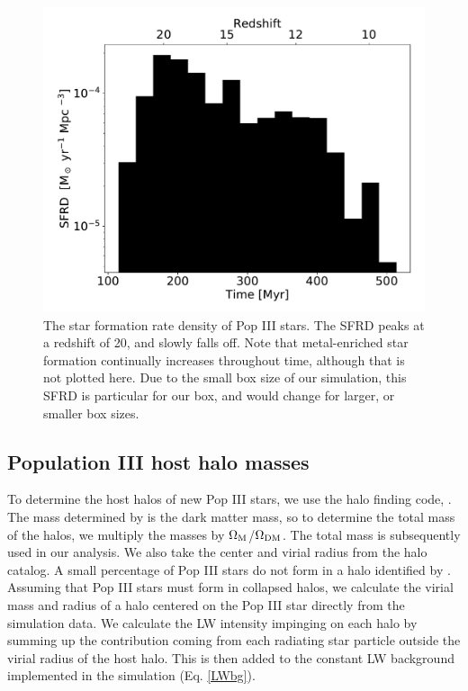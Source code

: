 \documentclass[a4paper,fleqn,usenatbib]{mnras}
\begin{document}
\begin{figure}
	\includegraphics[width=\columnwidth]{images/pop3_SFR_bar.pdf}
    \caption{The star formation rate density of Pop III stars. The SFRD peaks at a redshift of 20, and slowly falls off. Note that metal-enriched star formation continually increases throughout time, although that is not plotted here. Due to the small box size of our simulation, this SFRD is particular for our box, and would change for larger, or smaller box sizes.}
    \label{fig:pop3_SFR_bar}
\end{figure}

\subsection{Population III host halo masses}
 To determine the host halos of new Pop III stars, we use the halo finding code, \rockstar{} \citep{rockstar}. The mass determined by \rockstar{} is the dark matter mass, so to determine the total mass of the halos, we multiply the masses by $\Omega_{\rm M}$/$\Omega_{\rm DM}$. The total mass is subsequently used in our analysis. We also take the center and virial radius from the \rockstar{} halo catalog. A small percentage of Pop III stars do not form in a halo identified by \rockstar{}. Assuming that Pop III stars must form in collapsed halos, we calculate the virial mass and radius of a halo centered on the Pop III star directly from the simulation data. We calculate the LW intensity impinging on each halo by summing up the contribution coming from each radiating star particle outside the virial radius of the host halo. This is then added to the constant LW background implemented in the simulation (Eq. \ref{LWbg}). 
\end{document}

